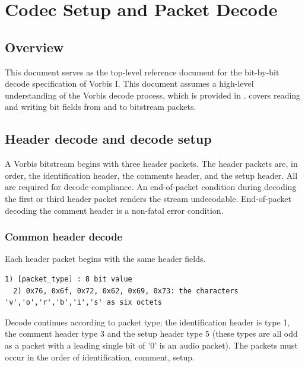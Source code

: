 \section{Codec Setup and Packet Decode} \label{vorbis:spec:codec}

\subsection{Overview}

This document serves as the top-level reference document for the
bit-by-bit decode specification of Vorbis I.  This document assumes a
high-level understanding of the Vorbis decode process, which is
provided in .   covers reading and writing bit fields from
and to bitstream packets.



\subsection{Header decode and decode setup}

A Vorbis bitstream begins with three header packets. The header
packets are, in order, the identification header, the comments header,
and the setup header. All are required for decode compliance.  An
end-of-packet condition during decoding the first or third header
packet renders the stream undecodable.  End-of-packet decoding the
comment header is a non-fatal error condition.

\subsubsection{Common header decode}

Each header packet begins with the same header fields.


\begin{Verbatim}[commandchars=\\\{\}]
  1) [packet_type] : 8 bit value
  2) 0x76, 0x6f, 0x72, 0x62, 0x69, 0x73: the characters 'v','o','r','b','i','s' as six octets
\end{Verbatim}

Decode continues according to packet type; the identification header
is type 1, the comment header type 3 and the setup header type 5
(these types are all odd as a packet with a leading single bit of '0'
is an audio packet).  The packets must occur in the order of
identification, comment, setup.




